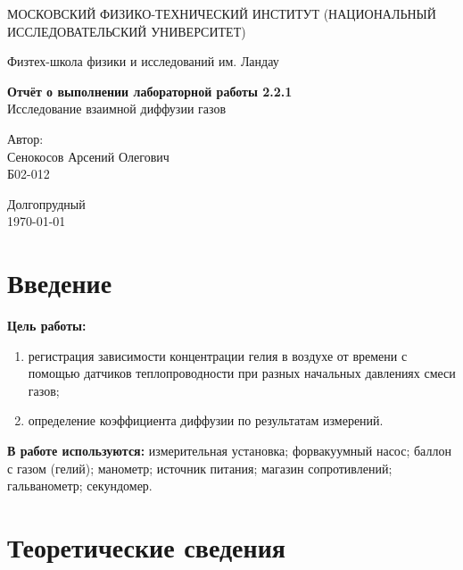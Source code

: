 \documentclass[a4paper,12pt]{article} %
\date{\today}
\begin{document}
\begin{titlepage}
	\begin{center}
		{\large МОСКОВСКИЙ ФИЗИКО-ТЕХНИЧЕСКИЙ ИНСТИТУТ (НАЦИОНАЛЬНЫЙ ИССЛЕДОВАТЕЛЬСКИЙ УНИВЕРСИТЕТ)}
	\end{center}
	\begin{center}
		{\large Физтех-школа физики и исследований им. Ландау}
	\end{center}
	
	
	\vspace{4.5cm}
	{\huge
		\begin{center}
			{\bf Отчёт о выполнении лабораторной работы 2.2.1}\\
			Исследование взаимной диффузии газов

		\end{center}
	}
	\vspace{2cm}
	\begin{flushright}
		{\LARGE Автор:\\ Сенокосов Арсений Олегович \\
			\vspace{0.2cm}
			Б02-012}
	\end{flushright}
	\vspace{8cm}
	\begin{center}
		Долгопрудный\\
		\today
	\end{center}
\end{titlepage}

\section{Введение}

\textbf{Цель работы:}  \begin{enumerate}
	\item регистрация зависимости концентрации гелия в воздухе от времени с помощью датчиков теплопроводности при разных начальных давлениях смеси газов;
	\item определение коэффициента диффузии по результатам измерений.
\end{enumerate}

\textbf{В работе используются:} измерительная установка; форвакуумный насос; баллон с газом (гелий); манометр; источник питания; магазин сопротивлений; гальванометр; секундомер.

\section{Теоретические сведения}
\end{document}
